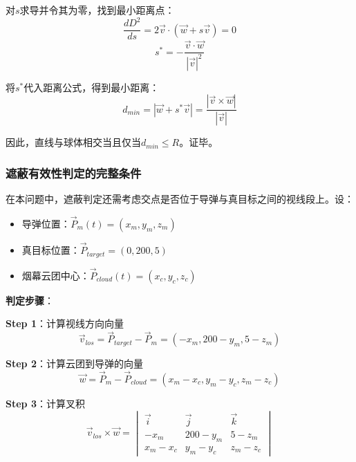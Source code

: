 \documentclass[12pt,a4paper]{article}
\begin{document}
对$s$求导并令其为零，找到最小距离点：
\begin{equation}
\frac{dD^2}{ds} = 2\vec{v} \cdot (\vec{w} + s\vec{v}) = 0
\end{equation}
\begin{equation}
s^* = -\frac{\vec{v} \cdot \vec{w}}{|\vec{v}|^2}
\end{equation}

将$s^*$代入距离公式，得到最小距离：
\begin{equation}
d_{min} = |\vec{w} + s^*\vec{v}| = \frac{|\vec{v} \times \vec{w}|}{|\vec{v}|}
\end{equation}

因此，直线与球体相交当且仅当$d_{min} \leq R$。证毕。

\subsubsection{遮蔽有效性判定的完整条件}

\indent 在本问题中，遮蔽判定还需考虑交点是否位于导弹与真目标之间的视线段上。设：
\begin{itemize}
\item 导弹位置：$\vec{P}_m(t) = (x_m, y_m, z_m)$
\item 真目标位置：$\vec{P}_{target} = (0, 200, 5)$
\item 烟幕云团中心：$\vec{P}_{cloud}(t) = (x_c, y_c, z_c)$
\end{itemize}

\noindent\textbf{判定步骤}：

\indent \textbf{Step 1}：计算视线方向向量
\begin{equation}
\vec{v}_{los} = \vec{P}_{target} - \vec{P}_m = (-x_m, 200 - y_m, 5 - z_m)
\end{equation}

\indent \textbf{Step 2}：计算云团到导弹的向量
\begin{equation}
\vec{w} = \vec{P}_m - \vec{P}_{cloud} = (x_m - x_c, y_m - y_c, z_m - z_c)
\end{equation}

\indent \textbf{Step 3}：计算叉积
\begin{equation}
\vec{v}_{los} \times \vec{w} = \begin{vmatrix} \vec{i} & \vec{j} & \vec{k} \\ -x_m & 200-y_m & 5-z_m \\ x_m-x_c & y_m-y_c & z_m-z_c \end{vmatrix}
\end{equation}
\end{document}
